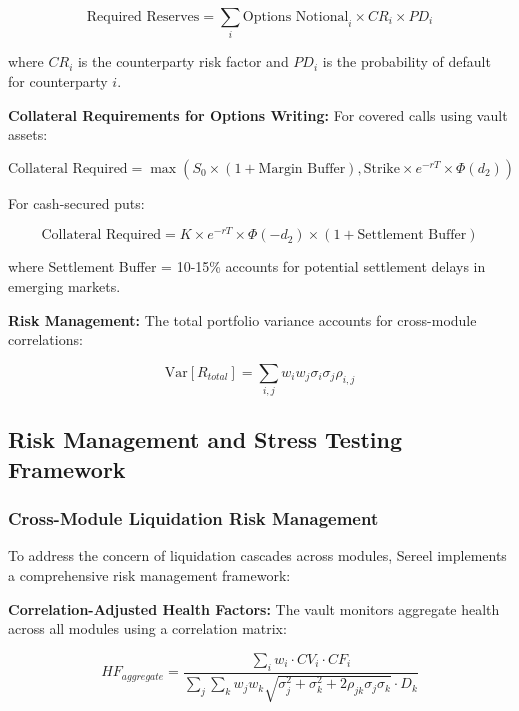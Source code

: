 \documentclass[12pt]{article}
\begin{document}
\begin{equation}
\text{Required Reserves} = \sum_i \text{Options Notional}_i \times CR_i \times PD_i
\end{equation}

where $CR_i$ is the counterparty risk factor and $PD_i$ is the probability of default for counterparty $i$.

\textbf{Collateral Requirements for Options Writing:}
For covered calls using vault assets:

\begin{equation}
\text{Collateral Required} = \max(S_0 \times (1 + \text{Margin Buffer}), \text{Strike} \times e^{-rT} \times \Phi(d_2))
\end{equation}

For cash-secured puts:

\begin{equation}
\text{Collateral Required} = K \times e^{-rT} \times \Phi(-d_2) \times (1 + \text{Settlement Buffer})
\end{equation}

where Settlement Buffer = 10-15\% accounts for potential settlement delays in emerging markets.

\textbf{Risk Management:}
The total portfolio variance accounts for cross-module correlations:

\begin{equation}
\text{Var}[R_{total}] = \sum_{i,j} w_i w_j \sigma_i \sigma_j \rho_{i,j}
\end{equation}
\subsection{Risk Management and Stress Testing Framework}

\subsubsection{Cross-Module Liquidation Risk Management}

To address the concern of liquidation cascades across modules, Sereel implements a comprehensive risk management framework:

\textbf{Correlation-Adjusted Health Factors:}
The vault monitors aggregate health across all modules using a correlation matrix:

\begin{equation}
HF_{aggregate} = \frac{\sum_i w_i \cdot CV_i \cdot CF_i}{\sum_j \sum_k w_j w_k \sqrt{\sigma_j^2 + \sigma_k^2 + 2\rho_{jk}\sigma_j\sigma_k} \cdot D_k}
\end{equation}
\end{document}
